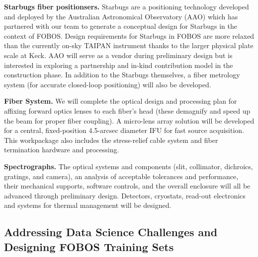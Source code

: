 \documentclass[oneside,11pt]{amsart}
\newcommand{\comment}[2][todo]{{\color{#1}[[{\bf #2}]]}}
\begin{document}
\noindent \textbf{Starbugs fiber positionsers.} Starbugs are a positioning technology developed and deployed by the
Australian Astronomical Observatory (AAO) which has partnered with our team to generate a conceptual design for
Starbugs in the context of FOBOS.  Design requirements for Starbugs in FOBOS are more relaxed than the currently on-sky
TAIPAN instrument thanks to the larger physical plate scale at Keck.  AAO will serve as a vendor during preliminary
design but is interested in exploring a partnership and in-kind contribution model in the construction phase.  In addition to the Starbugs themselves, a fiber metrology system (for accurate closed-loop positioning) will also be developed.

\noindent \textbf{Fiber System.} We will complete the optical design and processing plan for affixing forward optics
lenses to each fiber's head (these demagnify and speed up the beam for proper fiber coupling).  A micro-lens array
solution will be developed for a central, fixed-position 4.5-arcsec diameter IFU for fast source acquisition. This
workpackage also includes the stress-relief cable system and fiber termination hardware and processing.

\noindent \textbf{Spectrographs.} The optical systems and components (slit, collimator, dichroics, gratings, and camera), an analysis of acceptable tolerances and performance, their mechanical supports, software controls, and the overall enclosure will all be advanced through preliminary design.  Detectors, cryostats, read-out electronics and systems for thermal management will be designed.




\subsection{Addressing Data Science Challenges and Designing FOBOS Training Sets}
\label{sec:survey}
\end{document}
